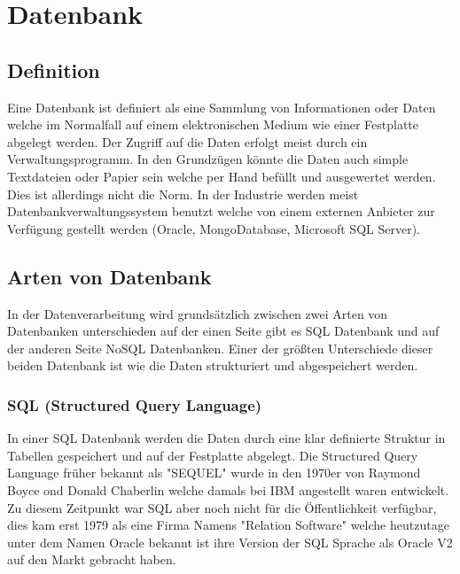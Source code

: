 \documentclass[12pt, letterpaper, twoside]{article}
\begin{document}
	
	\section{Datenbank}
	
	\subsection{Definition}
	Eine Datenbank ist definiert als eine Sammlung von Informationen oder Daten welche im Normalfall auf einem elektronischen Medium wie einer Festplatte abgelegt werden. Der Zugriff auf die Daten erfolgt meist durch ein Verwaltungsprogramm. In den Grundzügen könnte die Daten auch simple Textdateien oder Papier sein welche per Hand befüllt und ausgewertet werden. Dies ist allerdings nicht die Norm. In der Industrie werden meist Datenbankverwaltungssystem benutzt welche von einem externen Anbieter zur Verfügung gestellt werden (Oracle, MongoDatabase, Microsoft SQL Server).
	
	\subsection{Arten von Datenbank}
	In der Datenverarbeitung wird grundsätzlich zwischen zwei Arten von Datenbanken unterschieden auf der einen Seite gibt es SQL Datenbank und auf der anderen Seite NoSQL Datenbanken. Einer der größten Unterschiede dieser beiden Datenbank ist wie die Daten strukturiert und abgespeichert werden.
	
	\subsubsection{SQL (Structured Query Language)}
	In einer SQL Datenbank werden die Daten durch eine klar definierte Struktur in Tabellen gespeichert und auf der Festplatte abgelegt. Die Structured Query Language früher bekannt als "SEQUEL" wurde in den 1970er von Raymond Boyce ond Donald Chaberlin welche damals bei IBM angestellt waren entwickelt. Zu diesem Zeitpunkt war SQL aber noch nicht für die Öffentlichkeit verfügbar, dies kam erst 1979 als eine Firma Namens "Relation Software" welche heutzutage unter dem Namen Oracle bekannt ist ihre Version der SQL Sprache als Oracle V2 auf den Markt gebracht haben.
	
\end{document}
